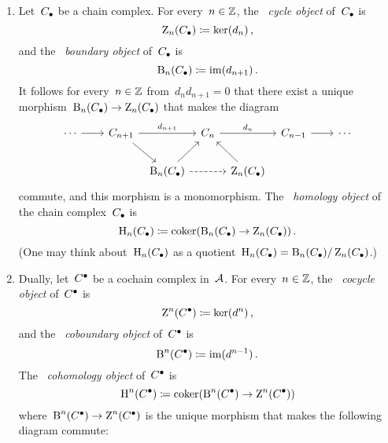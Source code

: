 \begin{definition}
  \leavevmode
  \begin{enumerate}
    \item
      Let~$C_\bullet$ be a chain complex.
      For every~$n \in \mathbb{Z}$, the~\emph{ cycle object} of~$C_\bullet$ is
      \[
                  \operatorname{Z}_n(C_\bullet)
        \coloneqq  \ker(d_n) \,,
      \]
      and the~\emph{ boundary object} of~$C_\bullet$ is
      \[
                  \operatorname{B}_n(C_\bullet)
        \coloneqq  \operatorname{im}(d_{n+1})  \,.
      \]
      It follows for every~$n \in \mathbb{Z}$ from~$d_n d_{n+1} = 0$ that there exist a unique morphism~$\operatorname{B}_n(C_\bullet) \to \operatorname{Z}_n(C_\bullet)$ that makes the diagram
      \[
        \begin{tikzcd}[column sep = tiny]
            \dotsb
            \arrow{rr}
          & {}
          & C_{n+1}
            \arrow{rr}[above]{d_{n+1}}
            \arrow{dr}
          & {}
          & C_n
            \arrow{rr}[above]{d_n}
          & {}
          & C_{n-1}
            \arrow{rr}
          & {}
          & \dotsb
          \\
            {}
          & {}
          & {}
          & \Bl_n(\Ccc)
            \arrow{ur}
            \arrow[dashed]{rr}
          & {}
          & \Zl_n(\Ccc)
            \arrow{ul}
          & {}
          & {}
          & {}
        \end{tikzcd}
      \]
      commute, and this morphism is a monomorphism.
      The~\emph{ homology object} of the chain complex~$C_\bullet$ is
      \[
                    \operatorname{H}_n(C_\bullet)
        \coloneqq    \operatorname{coker}(\operatorname{B}_n(C_\bullet) \to \operatorname{Z}_n(C_\bullet)) \,.
      \]
      (One may think about~$\operatorname{H}_n(C_\bullet)$ as a quotient~$\operatorname{H}_n(C_\bullet) = \operatorname{B}_n(C_\bullet)/\operatorname{Z}_n(C_\bullet)$.)
    \item
      Dually, let~$C^\bullet$ be a cochain complex in~$\mathcal{A}$.
      For every~$n \in \mathbb{Z}$, the~\emph{ cocycle object} of~$C^\bullet$ is
      \[
        \operatorname{Z}^n(C^\bullet) \coloneqq \ker(d^n) \,,
      \]
      and the~\emph{ coboundary object} of~$C^\bullet$ is
      \[
                  \operatorname{B}^n(C^\bullet)
        \coloneqq  \operatorname{im}(d^{n-1})  \,.
      \]
      The~\emph{ cohomology object} of~$C^\bullet$ is
      \[
                  \operatorname{H}^n(C^\bullet)
        \coloneqq  \operatorname{coker}( \operatorname{B}^n(C^\bullet)\to \operatorname{Z}^n(C^\bullet) )
      \]
      where~$\operatorname{B}^n(C^\bullet) \to \operatorname{Z}^n(C^\bullet)$ is the unique morphism that makes the following diagram commute:
      \[
        \begin{tikzcd}[column sep = tiny]

\end{tikzcd}\]
\end{enumerate}
\end{definition}
